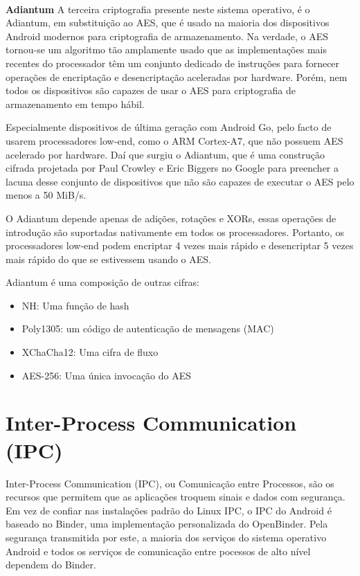 \\
\par \textbf{Adiantum}
A terceira criptografia presente neste sistema operativo, é o Adiantum, em substituição ao AES, que é usado na maioria dos dispositivos Android modernos para criptografia de armazenamento. Na verdade, o AES tornou-se um algoritmo tão amplamente usado que as implementações mais recentes do processador têm um conjunto dedicado de instruções para fornecer operações de encriptação e desencriptação aceleradas por hardware. Porém, nem todos os dispositivos são capazes de usar o AES para criptografia de armazenamento em tempo hábil. 
\par Especialmente dispositivos de última geração com Android Go, pelo facto de usarem processadores low-end, como o ARM Cortex-A7, que não possuem AES acelerado por hardware.
Daí que surgiu o Adiantum, que é uma construção cifrada projetada por Paul Crowley e Eric Biggers no Google para preencher a lacuna desse conjunto de dispositivos que não são capazes de executar o AES pelo menos a 50 MiB/s. 
\par O Adiantum depende apenas de adições, rotações e XORs, essas operações de introdução são suportadas nativamente em todos os processadores. Portanto, os processadores low-end podem encriptar 4 vezes mais rápido e desencriptar 5 vezes mais rápido do que se estivessem usando o AES.
\\
\par Adiantum é uma composição de outras cifras:
\begin{itemize}
    \item NH: Uma função de hash
    \item Poly1305: um código de autenticação de mensagens (MAC)
    \item XChaCha12: Uma cifra de fluxo
    \item AES-256: Uma única invocação do AES
\end{itemize}

\section{Inter-Process Communication (IPC)}
Inter-Process Communication (IPC), ou Comunicação entre Processos, são os recursos que permitem que as aplicações troquem sinais e dados com segurança. Em vez de confiar nas instalações padrão do Linux IPC, o IPC do Android é baseado no Binder, uma implementação personalizada do OpenBinder. Pela segurança transmitida por este, a maioria dos serviços do sistema operativo Android e todos os serviços de comunicação entre pocessos de alto nível dependem do Binder.




